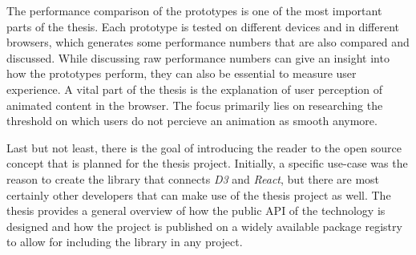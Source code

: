 The performance comparison of the prototypes is one of the most important parts of the thesis. Each prototype is tested on different devices and in different browsers, which generates some performance numbers that are also compared and discussed. While discussing raw performance numbers can give an insight into how the prototypes perform, they can also be essential to measure user experience. A vital part of the thesis is the explanation of user perception of animated content in the browser. The focus primarily lies on researching the threshold on which users do not percieve an animation as smooth anymore.

Last but not least, there is the goal of introducing the reader to the open source concept that is planned for the thesis project. Initially, a specific use-case was the reason to create the library that connects \emph{D3} and \emph{React}, but there are most certainly other developers that can make use of the thesis project as well. The thesis provides a general overview of how the public API of the technology is designed and how the project is published on a widely available package registry to allow for including the library in any project.
